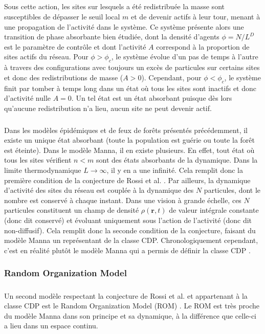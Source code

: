 \subparagraph{}Sous cette action, les sites sur lesquels a été redistribuée la masse sont susceptibles de dépasser le seuil local $m$ et de devenir actifs à leur tour, menant à une propagation de l'activité dans le système. Ce système présente alors une transition de phase absorbante bien étudiée, dont la densité d'agents $\phi = N/L^D$ est le paramètre de contrôle et dont l'activité $A$ correspond à la proportion de sites actifs du réseau. Pour $\phi > \phi_c$, le système évolue d'un pas de temps à l'autre à travers des configurations avec toujours un excès de particules sur certains sites et donc des redistributions de masse ($A>0$). Cependant, pour $\phi < \phi_c$, le système finit par tomber à temps long dans un état où tous les sites sont inactifs et donc d'activité nulle $A=0$. Un tel état est un état absorbant puisque dès lors qu'aucune redistribution n'a lieu, aucun site ne peut devenir actif. 

\subparagraph{}Dans les modèles épidémiques et de feux de forêts présentés précédemment, il existe un unique état absorbant (toute la population est guérie ou toute la forêt est éteinte). Dans le modèle Manna, il en existe plusieurs. En effet, tout état où tous les sites vérifient $n<m$ sont des états absorbants de la dynamique. Dans la limite thermodynamique $L\rightarrow \infty$, il y en a une infinité. Cela remplit donc la première condition de la conjecture de Rossi et al. \cite{rossi_universality_2000}. Par ailleurs, la dynamique d'activité des sites du réseau est couplée à la dynamique des $N$ particules, dont le nombre est conservé à chaque instant. Dans une vision à grande échelle, ces $N$ particules constituent un champ de densité $\rho (\mathbf{r}, t)$ de valeur intégrale constante (donc dit conservé) et évoluant uniquement sous l'action de l'activité (donc dit non-diffusif). Cela remplit donc la seconde condition de la conjecture, faisant du modèle Manna un représentant de la classe CDP. Chronologiquement cependant, c'est en réalité plutôt le modèle Manna qui a permis de définir la classe CDP \cite{lubeck_universal_2004}.

\subsubsection{Random Organization Model}

\subparagraph{}Un second modèle respectant la conjecture de Rossi et al. \cite{rossi_universality_2000} et appartenant à la classe CDP est le Random Organization Model (ROM) \cite{corte_random_2008, tjhung_criticality_2016}. Le ROM est très proche du modèle Manna dans son principe et sa dynamique, à la différence que celle-ci a lieu dans un espace continu.

